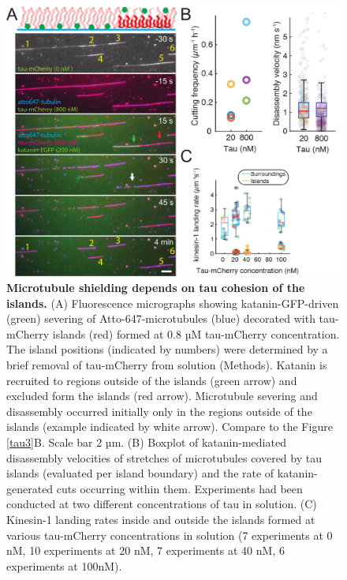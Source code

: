 \begin{figure}[h!]
\centering
\includegraphics[width=1\linewidth]{Figures/tau6.png}
\caption[Microtubule shielding depends on tau cohesion of the islands.]{ 
\textbf{Microtubule shielding depends on tau cohesion of the islands.} (A) Fluorescence micrographs showing katanin-GFP-driven (green) severing of Atto-647-microtubules (blue) decorated with tau-mCherry islands (red) formed at 0.8 µM tau-mCherry concentration. The island positions (indicated by numbers) were determined by a brief removal of tau-mCherry from solution (Methods). Katanin is recruited to regions outside of the islands (green arrow) and excluded form the islands (red arrow). Microtubule severing and disassembly occurred initially only in the regions outside of the islands (example indicated by white arrow). Compare to the Figure \ref{tau3}B. Scale bar 2 µm. (B) Boxplot of katanin-mediated disassembly velocities of stretches of microtubules covered by tau islands (evaluated per island boundary) and the rate of katanin-generated cuts occurring within them. Experiments had been conducted at two different concentrations of tau in solution. (C) Kinesin-1 landing rates inside and outside the islands formed at various tau-mCherry concentrations in solution (7 experiments at 0 nM, 10 experiments at 20 nM, 7 experiments at 40 nM, 6 experiments at 100nM).
	}\label{tau6}
\end{figure}
